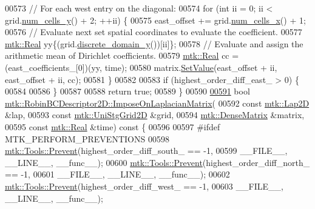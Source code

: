 \begin{DoxyCode}
00573   \textcolor{comment}{// For each west entry on the diagonal:}
00574   \textcolor{keywordflow}{for} (\textcolor{keywordtype}{int} ii = 0; ii < grid.\hyperlink{classmtk_1_1UniStgGrid2D_aed05a801cc9a76dba0ff203cea58a61a}{num\_cells\_y}() + 2; ++ii) \{
00575     east\_offset += grid.\hyperlink{classmtk_1_1UniStgGrid2D_a2d182866a398aba8e4829590e85bf939}{num\_cells\_x}() + 1;
00576     \textcolor{comment}{// Evaluate next set spatial coordinates to evaluate the coefficient.}
00577     \hyperlink{group__c01-roots_gac080bbbf5cbb5502c9f00405f894857d}{mtk::Real} yy\{(grid.\hyperlink{classmtk_1_1UniStgGrid2D_ac33a58d65105550dcf6f6b92b48b5105}{discrete\_domain\_y}())[ii]\};
00578     \textcolor{comment}{// Evaluate and assign the arithmetic mean of Dirichlet coefficients.}
00579     \hyperlink{group__c01-roots_gac080bbbf5cbb5502c9f00405f894857d}{mtk::Real} cc = (east\_coefficients\_[0])(yy, time);
00580     matrix.\hyperlink{classmtk_1_1DenseMatrix_a784ce5784109ac86bfb9d8562b334b13}{SetValue}(east\_offset + ii, east\_offset + ii, cc);
00581   \}
00582 
00583   \textcolor{keywordflow}{if} (highest\_order\_diff\_east\_ > 0) \{
00584 
00586   \}
00587 
00588   \textcolor{keywordflow}{return} \textcolor{keyword}{true};
00589 \}
00590 
\hypertarget{mtk__robin__bc__descriptor__2d_8cc_source_l00591}{}\hyperlink{classmtk_1_1RobinBCDescriptor2D_a0a26693f5265fcad978e7ba84e01ed69}{00591} \textcolor{keywordtype}{bool} \hyperlink{classmtk_1_1RobinBCDescriptor2D_a0a26693f5265fcad978e7ba84e01ed69}{mtk::RobinBCDescriptor2D::ImposeOnLaplacianMatrix}(
00592     \textcolor{keyword}{const} \hyperlink{classmtk_1_1Lap2D}{mtk::Lap2D} &lap,
00593     \textcolor{keyword}{const} \hyperlink{classmtk_1_1UniStgGrid2D}{mtk::UniStgGrid2D} &grid,
00594     \hyperlink{classmtk_1_1DenseMatrix}{mtk::DenseMatrix} &matrix,
00595     \textcolor{keyword}{const} \hyperlink{group__c01-roots_gac080bbbf5cbb5502c9f00405f894857d}{mtk::Real} &time)\textcolor{keyword}{ const }\{
00596 
00597 \textcolor{preprocessor}{  #ifdef MTK\_PERFORM\_PREVENTIONS}
00598   \hyperlink{classmtk_1_1Tools_a332324c6f25e66be9dff48c5987a3b9f}{mtk::Tools::Prevent}(highest\_order\_diff\_south\_ == -1,
00599                       \_\_FILE\_\_, \_\_LINE\_\_, \_\_func\_\_);
00600   \hyperlink{classmtk_1_1Tools_a332324c6f25e66be9dff48c5987a3b9f}{mtk::Tools::Prevent}(highest\_order\_diff\_north\_ == -1,
00601                       \_\_FILE\_\_, \_\_LINE\_\_, \_\_func\_\_);
00602   \hyperlink{classmtk_1_1Tools_a332324c6f25e66be9dff48c5987a3b9f}{mtk::Tools::Prevent}(highest\_order\_diff\_west\_ == -1,
00603                       \_\_FILE\_\_, \_\_LINE\_\_, \_\_func\_\_);

\end{DoxyCode}
